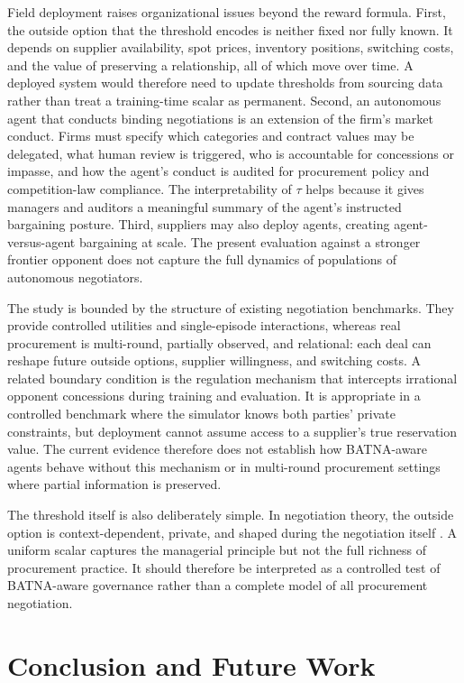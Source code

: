 \documentclass{interact}
\theoremstyle{plain}
\theoremstyle{definition}
\theoremstyle{remark}
\begin{document}
Field deployment raises organizational issues beyond the reward formula. First, the outside option that the threshold encodes is neither fixed nor fully known. It depends on supplier availability, spot prices, inventory positions, switching costs, and the value of preserving a relationship, all of which move over time. A deployed system would therefore need to update thresholds from sourcing data rather than treat a training-time scalar as permanent. Second, an autonomous agent that conducts binding negotiations is an extension of the firm's market conduct. Firms must specify which categories and contract values may be delegated, what human review is triggered, who is accountable for concessions or impasse, and how the agent's conduct is audited for procurement policy and competition-law compliance. The interpretability of $\tau$ helps because it gives managers and auditors a meaningful summary of the agent's instructed bargaining posture. Third, suppliers may also deploy agents, creating agent-versus-agent bargaining at scale. The present evaluation against a stronger frontier opponent does not capture the full dynamics of populations of autonomous negotiators.

The study is bounded by the structure of existing negotiation benchmarks. They provide controlled utilities and single-episode interactions, whereas real procurement is multi-round, partially observed, and relational: each deal can reshape future outside options, supplier willingness, and switching costs. A related boundary condition is the regulation mechanism that intercepts irrational opponent concessions during training and evaluation. It is appropriate in a controlled benchmark where the simulator knows both parties' private constraints, but deployment cannot assume access to a supplier's true reservation value. The current evidence therefore does not establish how BATNA-aware agents behave without this mechanism or in multi-round procurement settings where partial information is preserved.

The threshold itself is also deliberately simple. In negotiation theory, the outside option is context-dependent, private, and shaped during the negotiation itself \cite{fisher1981gettingtoyes,raiffa1982art}. A uniform scalar captures the managerial principle but not the full richness of procurement practice. It should therefore be interpreted as a controlled test of BATNA-aware governance rather than a complete model of all procurement negotiation.


\section{Conclusion and Future Work}\label{sec:conclusion}
\end{document}
